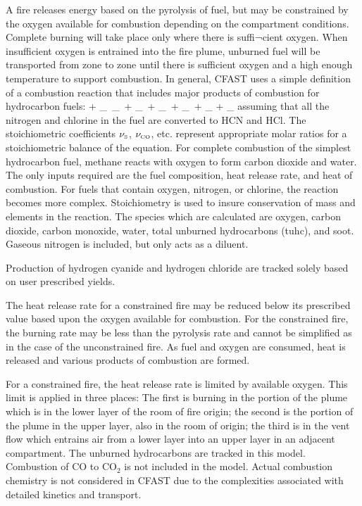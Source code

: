 A fire releases energy based on the pyrolysis of fuel, but may be constrained by the oxygen available for combustion depending on the compartment conditions. Complete burning will take place only where there is suffi¬cient oxygen.  When insufficient oxygen is entrained into the fire plume, unburned fuel will be transported from zone to zone until there is sufficient oxygen and a high enough temperature to support combustion.  In general, CFAST uses a simple definition of a combustion reaction that includes major products of combustion for hydrocarbon fuels:
\be  {} +  \nu_\OTWO \,   \rightarrow  \nu_\COTWO \,  + \nu_\HTWOO \,  + \nu_\CO \,  +
     \nu_\So \,   + \nu_\HCl {} + \nu_\HCN {} \label{stoich} \ee
assuming that all the nitrogen and chlorine in the fuel are converted to HCN and HCl. The stoichiometric coefficients $\nu_{\tiny \hbox{S}}$, $\nu_{\tiny \hbox{CO}}$, etc. represent appropriate molar ratios for a stoichiometric balance of the equation. For complete combustion of the simplest hydrocarbon fuel, methane reacts with oxygen to form carbon dioxide and water. The only inputs required are the fuel composition, heat release rate, and heat of combustion. For fuels that contain oxygen, nitrogen, or chlorine, the reaction becomes more complex. Stoichiometry is used to insure conservation of mass and elements in the reaction. The species which are calculated are oxygen, carbon dioxide, carbon monoxide, water, total unburned hydrocarbons (tuhc), and soot. Gaseous nitrogen is included, but only acts as a diluent.

Production of hydrogen cyanide and hydrogen chloride are tracked solely based on user prescribed yields.

The heat release rate for a constrained fire may be reduced below its prescribed value based upon the oxygen available for combustion. For the constrained fire, the burning rate may be less than the pyrolysis rate and cannot be simplified as in the case of the unconstrained fire. As fuel and oxygen are consumed, heat is released and various products of combustion are formed.

For a constrained fire, the heat release rate is limited by available oxygen. This limit is applied in three places: The first is burning in the portion of the plume which is in the lower layer of the room of fire origin; the second is the portion of the plume in the upper layer, also in the room of origin; the third is in the vent flow which entrains air from a lower layer into an upper layer in an adjacent compartment. The unburned hydrocarbons are tracked in this model. Combustion of CO to CO$_2$ is not included in the model. Actual combustion chemistry is not considered in CFAST due to the complexities associated with detailed kinetics and transport.

